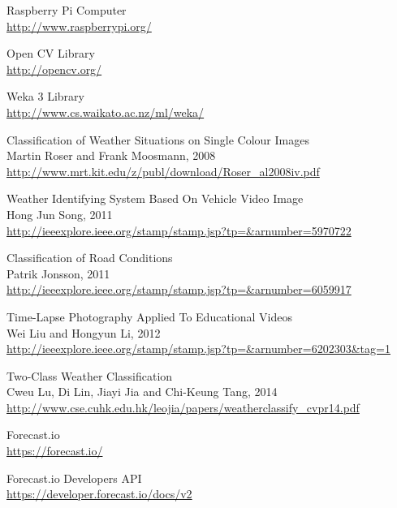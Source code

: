 \documentclass[12pt]{article}
\begin{document}
\begin{thebibliography}{widest-label}
        Raspberry Pi Computer 
        \\ \small\url{http://www.raspberrypi.org/}
 
        Open CV Library 
        \\ \small\url{http://opencv.org/}
 
        Weka 3 Library
        \\ \small\url{http://www.cs.waikato.ac.nz/ml/weka/}
 
  		Classification of Weather Situations on Single Colour Images
  		\\ Martin Roser and Frank Moosmann, 2008
  		\\ \small\url{http://www.mrt.kit.edu/z/publ/download/Roser_al2008iv.pdf}
 
  		Weather Identifying System Based On Vehicle Video Image
  		\\ Hong Jun Song, 2011
  		\\ \small\url{http://ieeexplore.ieee.org/stamp/stamp.jsp?tp=&arnumber=5970722}
  		
  		Classification of Road Conditions
  		\\ Patrik Jonsson, 2011
  		\\ \small\url{http://ieeexplore.ieee.org/stamp/stamp.jsp?tp=&arnumber=6059917}
  		
  		Time-Lapse Photography Applied To Educational Videos
  		\\ Wei Liu and Hongyun Li, 2012
  		\\ \small\url{http://ieeexplore.ieee.org/stamp/stamp.jsp?tp=&arnumber=6202303&tag=1}
  		
  		Two-Class Weather Classification
  		\\ Cweu Lu, Di Lin, Jiayi Jia and Chi-Keung Tang, 2014
  		\\ \small\url{http://www.cse.cuhk.edu.hk/leojia/papers/weatherclassify_cvpr14.pdf}
  		
  		Forecast.io
  		\\ \small\url{https://forecast.io/}
  		
  		Forecast.io Developers API
  		\\ \small\url{https://developer.forecast.io/docs/v2}
  		
\end{thebibliography}
\end{document}

